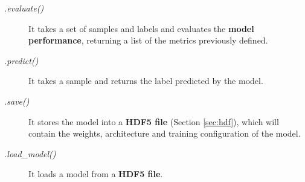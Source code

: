 \begin{description}
	\item[\textit{.evaluate()}] It takes a set of samples and labels and evaluates the \textbf{model performance}, returning a list of the metrics previously defined.
\end{description}

\begin{description}
	\item[\textit{.predict()}] It takes a sample and returns the label predicted by the model.
\end{description}

\begin{description}
	\item[\textit{.save()}] It stores the model into a \textbf{HDF5 file} (Section \ref{sec:hdf}), which will contain the weights, architecture and training configuration of the model.
\end{description}

\begin{description}
	\item[\textit{.load\_model()}] It loads a model from a \textbf{HDF5 file}.
\end{description}

